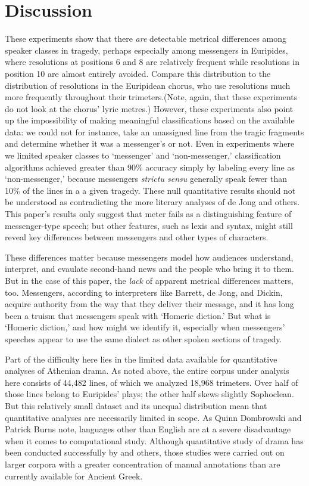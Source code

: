 \documentclass[
]{ceurart}
\begin{document}
\section{Discussion}


These experiments show that there \textit{are} detectable metrical differences
among speaker classes in tragedy, perhaps especially among messengers in
Euripides, where resolutions at positions 6 and 8 are relatively frequent
while resolutions in position 10 are almost entirely avoided. Compare this
distribution to the distribution of resolutions in the Euripidean chorus, who
use resolutions much more frequently throughout their trimeters.(Note, again,
that these experiments do not look at the chorus' lyric metres.) However,
these experiments also point up the impossibility of making meaningful
classifications based on the available data: we could not for instance, take
an unassigned line from the tragic fragments and determine whether it was a
messenger's or not. Even in experiments where we limited speaker classes to
`messenger' and `non-messenger,' classification algorithms achieved greater
than 90\% accuracy simply by labeling every line as `non-messenger,' because
messengers \textit{strictu sensu} generally speak fewer than 10\% of the
lines in a a given tragedy. These null quantitative results should not be
understood as contradicting the more literary analyses of de Jong and others.
This paper's results only suggest that meter fails as a distinguishing
feature of messenger-type speech; but other features, such as lexis and
syntax, might still reveal key differences between messengers and other types
of characters.

These differences matter because messengers model how audiences understand,
interpret, and evaulate second-hand news and the people who bring it to them.
But in the case of this paper, the \textit{lack} of apparent metrical
differences matters, too. Messengers, according to interpreters like Barrett,
de Jong, and Dickin, acquire authority from the way that they deliver their
message, and it has long been a truism that messengers speak with `Homeric diction.'
But what is `Homeric diction,' and how might we identify it, especially when
messengers' speeches appear to use the same dialect as other spoken sections
of tragedy.

Part of the difficulty here lies in the limited data available for quantitative
analyses of Athenian drama. As noted above, the entire corpus under analysis here
consists of 44,482 lines, of which we analyzed 18,968 trimeters. Over half of
those lines belong to Euripides' plays; the other half skews slightly Sophoclean.
But this relatively small dataset and its unequal distribution mean that quantitative
analyses are necessarily limited in scope. As Quinn Dombrowski and Patrick Burns
note, languages other than English are at a severe disadvantage when it comes
to computational study.\cite{Dombrowski.Burns2023} Although quantitative study
of drama has been conducted successfully by \cite{Beine2025} and others, those
studies were carried out on larger corpora with a greater concentration of
manual annotations than are currently available for Ancient Greek.
\end{document}
